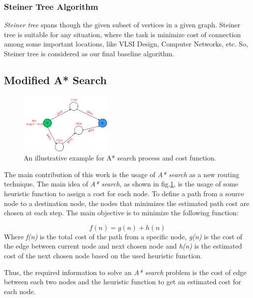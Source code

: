 \subsubsection{Steiner Tree Algorithm}
\emph{Steiner tree} spans though the given subset of vertices in a given graph. Steiner tree is suitable for any situation, where the task is minimize cost of connection among some important locations, like VLSI Design, Computer Networks, etc. So, Steiner tree is considered as our final baseline algorithm.

\subsection{Modified A* Search}
\begin{figure}[H]
    \centering
    \includegraphics[width=0.4\textwidth]{figures/a_star.png}
    \caption{An illustrative example for A* search process and cost function.}
    \label{fig:astar}
\end{figure}

The main contribution of this work is the usage of \emph{A* search} as a new routing technique. The main idea of \emph{A* search}, as shown in fig.\ref{fig:astar}, is the usage of some heuristic function to assign a cost for each node. To define a path from a source node to a destination node, the nodes that minimizes the estimated path cost are chosen at each step. The main objective is to minimize the following function:

\begin{equation} \label{eq:astar}
f(n) = g(n) + h(n)
\end{equation}
Where \emph{f(n)} is the total cost of the path from a specific node, \emph{g(n)} is the cost of the edge between current node and next chosen node and \emph{h(n)} is the estimated cost of the next chosen node based on the used heuristic function.

Thus, the required information to solve an \emph{A* search} problem is the cost of edge between each two nodes and the heuristic function to get an estimated cost for each node.

